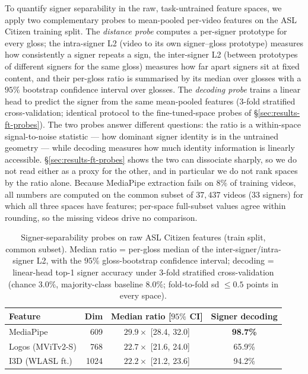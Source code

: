 To quantify signer separability in the raw, task-untrained feature spaces,
we apply two complementary probes to mean-pooled per-video features on the
ASL Citizen training split. The \emph{distance probe} computes a per-signer
prototype for every gloss; the intra-signer L2 (video to its own
signer--gloss prototype) measures how consistently a signer repeats a sign,
the inter-signer L2 (between prototypes of different signers for the same
gloss) measures how far apart signers sit at fixed content, and their
per-gloss ratio is summarised by its median over glosses with a $95\%$
bootstrap confidence interval over glosses. The \emph{decoding probe}
trains a linear head to predict the signer from the same mean-pooled
features (3-fold stratified cross-validation; identical protocol to the
fine-tuned-space probes of \S\ref{sec:results-ft-probes}). The two probes
answer different questions: the ratio is a within-space signal-to-noise
statistic --- how dominant signer identity is in the untrained geometry ---
while decoding measures how much identity information is linearly
accessible. \S\ref{sec:results-ft-probes} shows the two can dissociate
sharply, so we do not read either as a proxy for the other, and in
particular we do not rank spaces by the ratio alone. Because MediaPipe
extraction fails on $8\%$ of training videos, all numbers are computed on
the common subset of $37{,}437$ videos ($33$ signers) for which all three
spaces have features; per-space full-subset values agree within rounding,
so the missing videos drive no comparison.

\begin{table}[t]
\centering\footnotesize
\caption{Signer-separability probes on raw ASL Citizen features (train
split, common subset). Median ratio = per-gloss median of the
inter-signer/intra-signer L2, with the $95\%$ gloss-bootstrap confidence
interval; decoding = linear-head top-1 signer accuracy under 3-fold
stratified cross-validation (chance $3.0\%$, majority-class baseline
$8.0\%$; fold-to-fold sd $\leq 0.5$ points in every space).}
\label{tab:raw_feature_l2_probe}
\begin{tabular}{lrcc}
\toprule
Feature & Dim & Median ratio [$95\%$ CI] & Signer decoding \\
\midrule
MediaPipe        &  609 & $29.9\times$ [28.4, 32.0] & \textbf{98.7\%} \\
Logos (MViTv2-S) &  768 & $22.7\times$ [21.6, 24.0] & 65.9\% \\
I3D (WLASL ft.)  & 1024 & $22.2\times$ [21.2, 23.6] & 94.2\% \\
\bottomrule
\end{tabular}
\end{table}


